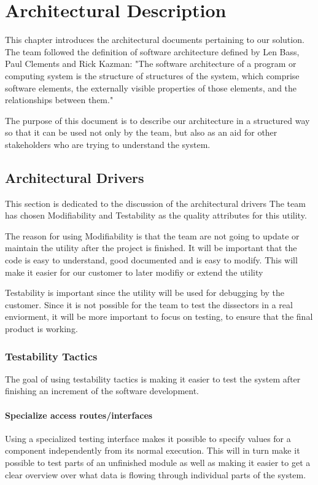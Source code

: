 \chapter{Architectural Description}
This chapter introduces the architectural documents pertaining to our solution. The team followed the definition of software architecture defined by Len Bass, Paul Clements and Rick Kazman: "The software architecture of a program or computing
system is the structure of structures of the system, which comprise software elements, the externally visible properties of those elements, and the relationships between them."

The purpose of this document is to describe our architecture in a structured way so that it can be used not only by the team, but also as an aid for other stakeholders who are trying to understand the system.

\section{Architectural Drivers}
This section is dedicated to the discussion of the architectural drivers
The team has chosen Modifiability and Testability as the quality attributes for this utility. 

The reason for using Modifiability is that the team are not going to update or maintain the utility after the project is finished. It will be important that the code is easy to understand, good documented and is easy to modify. This will make it easier for our customer to later modifiy or extend the utility

Testability is important since the utility will be used for debugging by the customer.  Since it is not possible for the team to test the dissectors in a real enviorment, it will be more important to focus on testing, to ensure that the final product is working.

\subsection{Testability Tactics}
The goal of using testability tactics is making it easier to test the system after finishing an increment of the software development. 

\subsubsection{Specialize access routes/interfaces}
Using a specialized testing interface makes it possible to specify values for a component independently from its normal execution. This will in turn make it possible to test parts of an unfinished module as well as making it easier to get a clear overview over what data is flowing through individual parts of the system.

